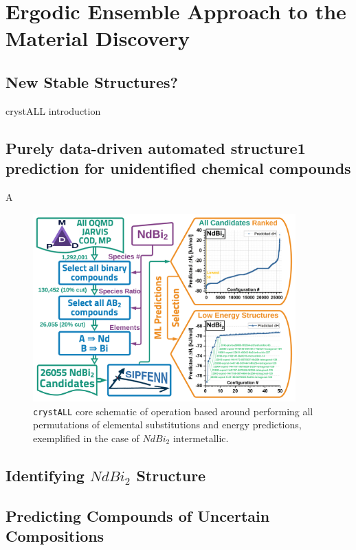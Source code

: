 \chapter{Ergodic Ensemble Approach to the Material Discovery} \label{chap:crystall}

\section{New Stable Structures?} \label{sec:newstable}

crystALL introduction


\section{Purely data-driven automated structure1
prediction for unidentified chemical compounds} \label{sec:crystall}

A

\begin{figure}[h]
    \centering
    \includegraphics[width=0.9\textwidth]{crystall/NdBi2_GraphicalAbstract_V4.png}
    \caption{\texttt{crystALL} core schematic of operation based around performing all permutations of elemental substitutions and energy predictions, exemplified in the case of $NdBi_2$ intermetallic.}
    \label{fig:crystallcompound}
\end{figure}

\section{Identifying $NdBi_2$ Structure} 


\section{Predicting Compounds of Uncertain Compositions} \label{sec:crystallcompositional}


